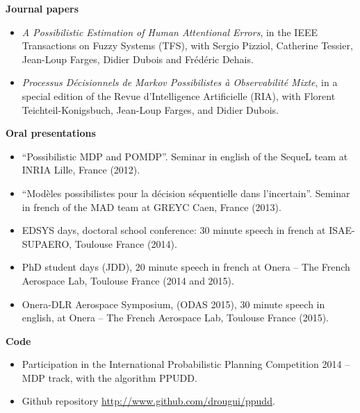 \textbf{Journal papers}
\begin{itemize}
\item \textit{A Possibilistic Estimation of Human Attentional Errors},
in the IEEE Transactions on Fuzzy Systems (TFS),
with Sergio Pizziol, Catherine Tessier, Jean-Loup Farges, Didier Dubois and Fr\'ed\'eric Dehais.
\item \textit{Processus D\'ecisionnels de Markov Possibilistes \`a Observabilit\'e Mixte},
in a special edition of the Revue d'Intelligence Artificielle (RIA),
with Florent Teichteil-Konigsbuch, Jean-Loup Farges, and Didier Dubois.
\end{itemize}

\textbf{Oral presentations}
\begin{itemize}
\item ``Possibilistic MDP and POMDP''. Seminar in english of the SequeL team at INRIA Lille, France (2012). 
\item ``Mod\`eles possibilistes pour la d\'ecision s\'equentielle dans l'incertain''. Seminar in french of the MAD team at GREYC Caen, France (2013).
\item EDSYS days, doctoral school conference: $30$ minute speech in french at ISAE-SUPAERO, Toulouse France (2014). 
\item PhD student days (JDD), $20$ minute speech in french at Onera -- The French Aerospace Lab, Toulouse France (2014 and 2015).
\item Onera-DLR Aerospace Symposium, (ODAS 2015), $30$ minute speech in english, at Onera -- The French Aerospace Lab, Toulouse France (2015).
\end{itemize}

\textbf{Code}
\begin{itemize}
\item Participation in the International Probabilistic Planning Competition 2014 -- MDP track, with the algorithm PPUDD.
\item Github repository \url{http://www.github.com/drougui/ppudd}.
\end{itemize}
